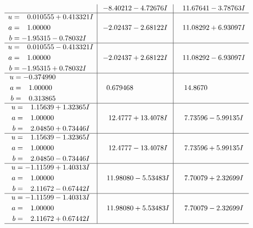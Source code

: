 \documentclass[1p]{elsarticle_modified}
\theoremstyle{definition}
\begin{document}
$$\begin{array}{c|c|c}
 & -8.40212 - 4.72676 I & \phantom{-}11.67641 - 3.78763 I \\ \hline\begin{aligned}
u &= \phantom{-}0.010555 + 0.413321 I \\
a &= \phantom{-}1.00000\phantom{ +0.000000I} \\
b &= -1.95315 - 0.78032 I\end{aligned}
 & -2.02437 - 2.68122 I & \phantom{-}11.08292 + 6.93097 I \\ \hline\begin{aligned}
u &= \phantom{-}0.010555 - 0.413321 I \\
a &= \phantom{-}1.00000\phantom{ +0.000000I} \\
b &= -1.95315 + 0.78032 I\end{aligned}
 & -2.02437 + 2.68122 I & \phantom{-}11.08292 - 6.93097 I \\ \hline\begin{aligned}
u &= -0.374990\phantom{ +0.000000I} \\
a &= \phantom{-}1.00000\phantom{ +0.000000I} \\
b &= \phantom{-}0.313865\phantom{ +0.000000I}\end{aligned}
 & \phantom{-}0.679468\phantom{ +0.000000I} & \phantom{-}14.8670\phantom{ +0.000000I} \\ \hline\begin{aligned}
u &= \phantom{-}1.15639 + 1.32365 I \\
a &= \phantom{-}1.00000\phantom{ +0.000000I} \\
b &= \phantom{-}2.04850 + 0.73446 I\end{aligned}
 & \phantom{-}12.4777 + 13.4078 I & \phantom{-}7.73596 - 5.99135 I \\ \hline\begin{aligned}
u &= \phantom{-}1.15639 - 1.32365 I \\
a &= \phantom{-}1.00000\phantom{ +0.000000I} \\
b &= \phantom{-}2.04850 - 0.73446 I\end{aligned}
 & \phantom{-}12.4777 - 13.4078 I & \phantom{-}7.73596 + 5.99135 I \\ \hline\begin{aligned}
u &= -1.11599 + 1.40313 I \\
a &= \phantom{-}1.00000\phantom{ +0.000000I} \\
b &= \phantom{-}2.11672 - 0.67442 I\end{aligned}
 & \phantom{-}11.98080 - 5.53483 I & \phantom{-}7.70079 + 2.32699 I \\ \hline\begin{aligned}
u &= -1.11599 - 1.40313 I \\
a &= \phantom{-}1.00000\phantom{ +0.000000I} \\
b &= \phantom{-}2.11672 + 0.67442 I\end{aligned}
 & \phantom{-}11.98080 + 5.53483 I & \phantom{-}7.70079 - 2.32699 I\\
 \hline 
 \end{array}$$\newpage\newpage\renewcommand{\arraystretch}{1}
\end{document}
